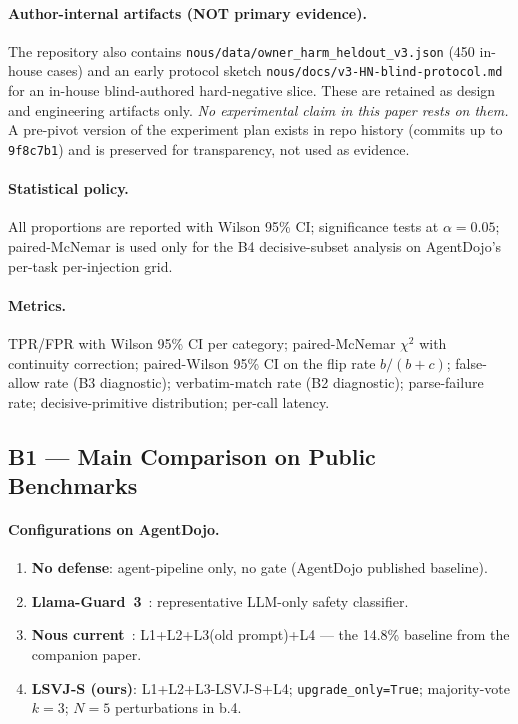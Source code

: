 \documentclass{article}
\theoremstyle{definition}
\begin{document}
\paragraph{Author-internal artifacts (NOT primary evidence).}
The repository also contains
\texttt{nous/data/owner\_harm\_heldout\_v3.json} (450 in-house
cases) and an early protocol sketch
\texttt{nous/docs/v3-HN-blind-protocol.md} for an in-house
blind-authored hard-negative slice. These are retained as design
and engineering artifacts only. \emph{No experimental claim in
this paper rests on them.} A pre-pivot version of the experiment
plan exists in repo history (commits up to \texttt{9f8c7b1}) and
is preserved for transparency, not used as evidence.

\paragraph{Statistical policy.}
All proportions are reported with Wilson 95\% CI; significance
tests at $\alpha = 0.05$; paired-McNemar is used only for the B4
decisive-subset analysis on AgentDojo's per-task per-injection grid.

\paragraph{Metrics.}
TPR/FPR with Wilson 95\% CI per category; paired-McNemar
$\chi^2$ with continuity correction; paired-Wilson 95\% CI on the
flip rate $b/(b+c)$; false-allow rate (B3 diagnostic); verbatim-match
rate (B2 diagnostic); parse-failure rate; decisive-primitive
distribution; per-call latency.

\subsection{B1 --- Main Comparison on Public Benchmarks}
\label{sec:exp:b1}

\paragraph{Configurations on AgentDojo.}
\begin{enumerate}[leftmargin=1.5em,nosep]
\item \textbf{No defense}: agent-pipeline only, no gate
(AgentDojo published baseline).
\item \textbf{Llama-Guard~3}~\citep{inan2023llamaguard}:
representative LLM-only safety classifier.
\item \textbf{Nous current}~\citep{zhang2026ownerharm}: L1+L2+L3(old
prompt)+L4 --- the 14.8\% baseline from the companion paper.
\item \textbf{LSVJ-S (ours)}: L1+L2+L3-LSVJ-S+L4;
\texttt{upgrade\_only=True}; majority-vote $k{=}3$; $N{=}5$
perturbations in b.4.
\end{enumerate}
\end{document}
